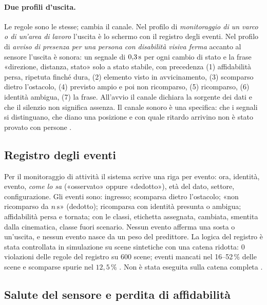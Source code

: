 \paragraph{Due profili d'uscita.} Le regole sono le stesse; cambia il canale. Nel profilo di \emph{monitoraggio di un varco o di un'area di lavoro} l'uscita è lo schermo con il registro degli eventi. Nel profilo di \emph{avviso di presenza per una persona con disabilità visiva ferma} accanto al sensore l'uscita è sonora: un segnale di $0{,}3\,\mathrm{s}$ per ogni cambio di stato e la frase «direzione, distanza, stato» solo a stato stabile, con precedenza (1) affidabilità persa, ripetuta finché dura, (2) elemento visto in avvicinamento, (3) scomparso dietro l'ostacolo, (4) previsto ampio e poi non ricomparso, (5) ricomparso, (6) identità ambigua, (7) la frase. All'avvio il canale dichiara la sorgente dei dati e che il silenzio non significa assenza. Il canale sonoro è una specifica: che i segnali si distinguano, che diano una posizione e con quale ritardo arrivino non è stato provato con persone .

\subsection{Registro degli eventi}\label{sec:lim-registro}

Per il monitoraggio di attività il sistema scrive una riga per evento: ora, identità, evento, \emph{come lo sa} («osservato» oppure «dedotto»), età del dato, settore, configurazione. Gli eventi sono: ingresso; scomparsa dietro l'ostacolo; «non ricomparso da $n\,\mathrm{s}$» (dedotto); ricomparsa con identità presunta o ambigua; affidabilità persa e tornata; con le classi, etichetta assegnata, cambiata, smentita dalla cinematica, classe fuori scenario. Nessun evento afferma una sosta o un'uscita, e nessun evento nasce da un peso del predittore. La logica del registro è stata controllata in simulazione su scene sintetiche con una catena ridotta: 0 violazioni delle regole del registro su 600 scene; eventi mancati nel 16--52\,\% delle scene e scomparse spurie nel $12{,}5\,\%$ . Non è stata eseguita sulla catena completa .

\subsection{Salute del sensore e perdita di affidabilità}\label{sec:lim-salute}

